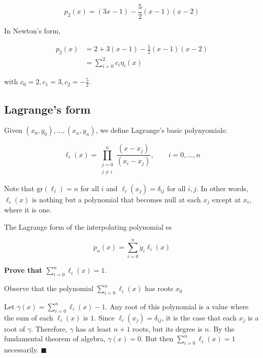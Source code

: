 \documentclass[12pt]{article}
\theoremstyle{definition}
\begin{document}
\begin{shaded}
    \begin{equation*}
        p_2(x) = ( 3x - 1 ) -\frac{5}{2}(x - 1)(x-2)
    \end{equation*}

    In Newton's form, 

    \begin{align*}
        p_2(x) 
        &= 2 + 3(x-1) - \frac{5}{2}(x-1)(x-2) \\ 
        &= \sum_{i=0}^2 c_i \eta_i(x)
    \end{align*}

    with $c_0 = 2, c_1 = 3, c_2 = -\frac{5}{2}$.

\end{shaded}

\subsection{Lagrange's form}

Given $(x_0, y_0), \ldots, (x_n, y_n)$, we define Lagrange's basic polynyomials:

\begin{equation*}
    \ell_i(x) = \prod_{\substack{j=0\\j\neq i}}^n \frac{(x-x_j)}{(x_i - x_j)},
    \qquad i = 0, \ldots, n
\end{equation*}

Note that $\text{gr}(\ell_i) = n$ for all $i$ and $\ell_i(x_j) = \delta_{ij}$
for all $i, j$. In other words, $\ell_i(x)$ is nothing but a polynomial that
becomes null at each $x_j$ except at $x_i$, where it is one. 

The Lagrange form of the interpolating polynomial es 

\begin{equation*}
    p_n(x) = \sum_{i=0}^n y_i \ell_i(x)
\end{equation*}

\begin{shaded}
    \textbf{Prove that $\sum_{i=0}^n \ell_i(x) = 1$}. 

    Observe that the polynomial $\sum_{i=0}^n \ell_i(x)$ has roots $x_0$

    Let $\gamma(x) = \sum_{i=0}^n \ell_i(x) - 1$. Any root of this polynomial is
    a value where the sum of each $\ell_i(x)$ is $1$. Since $\ell_i(x_j) =
    \delta_{ij}$, it is the case that each $x_j$ is a root of $\gamma$. 
    Therefore, $\gamma$ has at least $n+1$ roots, but its degree is $n$. 
    By the fundamental theorem of algebra, $\gamma(x) = 0$. But then
    $\sum_{i=0}^n \ell_i(x) = 1$ necessarily. $\blacksquare$
\end{shaded}
\end{document}
